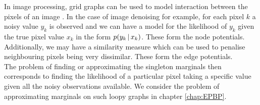 In image processing, grid graphs can be used to model interaction between the pixels of an image  \citep{blake11}. 
In the case of image denoising for example, for each pixel $k$ a noisy value $y_k$ is observed and we can have a model for the likelihood of $y_k$ given the true pixel value $x_k$ in the form $p(y_k\,|\, x_k)$. These  form the node potentials. 
Additionally, we may have a similarity measure which can be used to penalise neighbouring pixels being very dissimilar. These form the edge potentials.\\
The problem of finding or approximating the singleton marginals then corresponds to finding the likelihood of a particular pixel taking a specific value given all the noisy observations available. We consider the problem of approximating marginals on such loopy graphs in chapter \ref{chap:EPBP}. 

